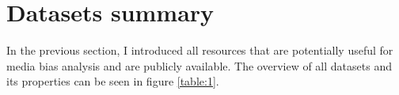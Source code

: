 \section{Datasets summary}
In the previous section, I introduced all resources that are potentially useful for media bias analysis and are publicly available. The overview of all datasets and its properties can be seen in figure \ref{table:1}.
